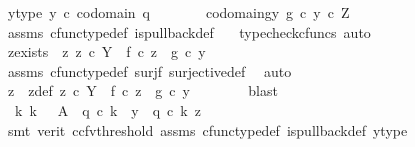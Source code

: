 \begin{isabellebody}
\ y{\isacharunderscore}{\kern0pt}type{\isacharcolon}{\kern0pt}\ {\isachardoublequoteopen}y\ {\isasymin}\isactrlsub c\ codomain\ q{}{\isachardoublequoteclose}\isanewline
\ \ \ \ \isamarkupfalse%
\ \isamarkupfalse%
\ codomain{\isacharunderscore}{\kern0pt}gy{\isacharcolon}{\kern0pt}\ {\isachardoublequoteopen}g\ {\isasymcirc}\isactrlsub c\ y\ {\isasymin}\isactrlsub c\ Z{\isachardoublequoteclose}\isanewline
\ \ \ \ \ \ \isamarkupfalse%
\ assms{\isacharparenleft}{\kern0pt}{}{\isacharparenright}{\kern0pt}\ cfunc{\isacharunderscore}{\kern0pt}type{\isacharunderscore}{\kern0pt}def\ is{\isacharunderscore}{\kern0pt}pullback{\isacharunderscore}{\kern0pt}def\ \ \isamarkupfalse%
\ {\isacharparenleft}{\kern0pt}typecheck{\isacharunderscore}{\kern0pt}cfuncs{\isacharcomma}{\kern0pt}\ auto{\isacharparenright}{\kern0pt}\isanewline
\ \ \ \ \isamarkupfalse%
\ \isamarkupfalse%
\ z{\isacharunderscore}{\kern0pt}exists{\isacharcolon}{\kern0pt}\ {\isachardoublequoteopen}{\isasymexists}\ z{\isachardot}{\kern0pt}\ z\ {\isasymin}\isactrlsub c\ Y\ {\isasymand}\ f\ {\isasymcirc}\isactrlsub c\ z\ {\isacharequal}{\kern0pt}\ g\ {\isasymcirc}\isactrlsub c\ y{\isachardoublequoteclose}\isanewline
\ \ \ \ \ \ \isamarkupfalse%
\ assms{\isacharparenleft}{\kern0pt}{}{\isacharparenright}{\kern0pt}\ cfunc{\isacharunderscore}{\kern0pt}type{\isacharunderscore}{\kern0pt}def\ surj{\isacharunderscore}{\kern0pt}f\ surjective{\isacharunderscore}{\kern0pt}def\ \isamarkupfalse%
\ auto\isanewline
\ \ \ \ \isamarkupfalse%
\ \isamarkupfalse%
\ z\ \ z{\isacharunderscore}{\kern0pt}def{\isacharcolon}{\kern0pt}\ {\isachardoublequoteopen}z\ {\isasymin}\isactrlsub c\ Y\ {\isasymand}\ f\ {\isasymcirc}\isactrlsub c\ z\ {\isacharequal}{\kern0pt}\ g\ {\isasymcirc}\isactrlsub c\ y{\isachardoublequoteclose}\isanewline
\ \ \ \ \ \ \isamarkupfalse%
\ blast\isanewline
\ \ \ \ \isamarkupfalse%
\ \isamarkupfalse%
\ {\isachardoublequoteopen}{\isasymexists}{\isacharbang}{\kern0pt}\ k{\isachardot}{\kern0pt}\ k{\isacharcolon}{\kern0pt}\ {\isasymone}\ {\isasymrightarrow}\ A\ {\isasymand}\ q{}\ {\isasymcirc}\isactrlsub c\ k\ {\isacharequal}{\kern0pt}\ y\ {\isasymand}\ q{}\ {\isasymcirc}\isactrlsub c\ k\ {\isacharequal}{\kern0pt}z{\isachardoublequoteclose}\isanewline
\ \ \ \ \ \ \isamarkupfalse%
\ {\isacharparenleft}{\kern0pt}smt\ {\isacharparenleft}{\kern0pt}verit{\isacharcomma}{\kern0pt}\ ccfv{\isacharunderscore}{\kern0pt}threshold{\isacharparenright}{\kern0pt}\ assms{\isacharparenleft}{\kern0pt}{}{\isacharparenright}{\kern0pt}\ cfunc{\isacharunderscore}{\kern0pt}type{\isacharunderscore}{\kern0pt}def\ is{\isacharunderscore}{\kern0pt}pullback{\isacharunderscore}{\kern0pt}def\ y{\isacharunderscore}{\kern0pt}type{\isacharparenright}{\kern0pt}\isanewline

\end{isabellebody}
